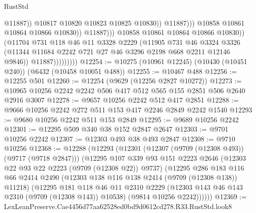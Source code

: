 \begin{lexlean}{RustStd}
\begin{coremodule}
                                                @11887))
                                            @10817
                                            @10820
                                            @10823
                                            @10825
                                            @10830))
                                        @11887)))
                                  @10858
                                  @10861
                                  @10864
                                  @10866
                                  @10830))
                              @11887)))
                        @10858
                        @10861
                        @10864
                        @10866
                        @10830))
                    (@11704
                      @731
                      @118
                      @46
                      @11
                      @3328
                      @2229
                      (@11905
                        @731
                        @46
                        @3324
                        @3326
                        (@11344 @11684 @2242 @721 @27 @46 @3296 @2198 @668 @2211 @12146 @9846))
                      @11887)))))))))
@12254 := @10275 (@10961 @12245) (@10430 (@10451 @240)) (@6432 (@10458 @10051 @488))
@12255 := @10467 @488
@12256 := @12255 @501
@12260 := @12254 (@9629 (@12256 @2827 @10272))
@12273 := @10965 @10256 @2242 @2242 @506 @417 @512 @565 @155 @2851 @506 @2640 @2916 @3007
@12278 := @9657 @10256 @2242 @512 @417 @2851
@12288 := @9666 @10256 @2242 @272 @511 @153 @417 @2246 @2849 @2242 @1540
@12293 := @9680 @10256 @2242 @511 @153 @2849
@12295 := @9689 @10256 @2242
@12301 := @12295 @509 @340 @38 @152 @2847 @2647
@12303 := @9701 @10256 @2242
@12307 := @12303 @493 @38 @493 @2847
@12308 := @9710 @10256
@12368 := @12288
    (@12293
      (@12301
        (@12307 (@9709 (@12308 @493)) (@9717 (@9718 @2847)))
        (@12295
          @107
          @339
          @93
          @151
          @2223
          @2646
          (@12303 @22 @93 @22 @2223 (@9709 (@12308 @22)) @9737)
          (@12295
            @286
            @183
            @116
            @66
            @2414
            @2490
            (@12303 @138 @116 @138 @2414 (@9709 (@12308 @138)) @11218)
            (@12295
              @181
              @118
              @46
              @11
              @2310
              @2229
              (@12303 @143 @46 @143 @2310 (@9709 (@12308 @143)) @10538)
              (@9814 @10256 @2242))))))
@12369 := LexLeanPreserve.Cae4456d77aa62528ed0bd9d0612cd278.R33.RustStd.look8

\end{coremodule}
\end{lexlean}
